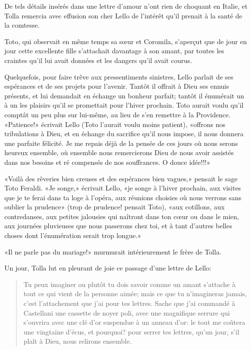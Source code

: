 De tels détails insérés dans une lettre d'amour n'ont rien de choquant
en Italie, et Tolla remercia avec effusion son cher Lello de l'intérêt
qu'il prenait à la santé de la comtesse.

Toto, qui observait en même temps sa sœur et Coromila, s'aperçut que de
jour en jour cette excellente fille s'attachait davantage à son amant,
par toutes les craintes qu'il lui avait données et les dangers qu'il
avait courus.

Quelquefois, pour faire trêve aux pressentiments sinistres, Lello
parlait de ses espérances et de ses projets pour l'avenir. Tantôt il
offrait à Dieu ses ennuis présents, et lui demandait en échange un
bonheur parfait; tantôt il énumérait un à un les plaisirs qu'il se
promettait pour l'hiver prochain. Toto aurait voulu qu'il comptât un peu
plus sur lui-même, au lieu de s'en remettre à la Providence. «Patience!»
écrivait Lello (Toto l'aurait voulu moins patient), «offrons nos
tribulations à Dieu, et en échange du sacrifice qu'il nous impose, il
nous donnera une parfaite félicité. Je me repais déjà de la pensée de
ces jours où nous serons heureux ensemble, où ensemble nous remercierons
Dieu de nous avoir assistés dans nos besoins et ré compensés de nos
souffrances. O douce idée!!!»

«Voilà des rêveries bien creuses et des espérances bien vagues,» pensait
le sage Toto Feraldi. «Je songe,» écrivait Lello, «je songe à l'hiver
prochain, aux visites que je te ferai dans ta loge à l'opéra, aux
réunions choisies où nous verrons sans oublier la prudence» (trop de
prudence! pensait Toto), «aux cotillons, aux contredanses, aux petites
jalousies qui naîtront dans ton cœur ou dans le mien, aux journées
pluvieuses que nous passerons chez toi, et à tant d'autres belles choses
dont l'énumération serait trop longue.»

«Il ne parle pas du mariage!» murmurait intérieurement le frère de
Tolla.

Un jour, Tolla lut en pleurant de joie ce passage d'une lettre de Lello:

\begin{quote}
Tu peux imaginer ou plutôt tu dois savoir comme un amant s'attache à
tout ce qui vient de la personne aimée; mais ce que tu n'imagineras
jamais, c'est l'attachement que j'ai pour tes lettres. Sache que j'ai
commandé à Castellani une cassette de noyer poli, avec une magnifique
serrure qui s'ouvrira avec une clé d'or suspendue à un anneau d'or: le
tout me coûtera une vingtaine d'écus, et pourquoi? pour serrer tes
lettres, qu'un jour, s'il plaît à Dieu, nous relirons ensemble.
\end{quote}

